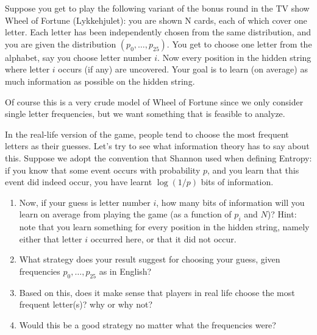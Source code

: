 \documentclass{article}
\begin{document}
\begin{exmp}
    \small
    Suppose you get to play the following variant of the bonus round in the TV show Wheel of Fortune (Lykkehjulet): you are shown N cards, each of which cover one letter. Each letter has been independently chosen from the same distribution, and you are given the distribution $(p_0,\dots,p_{25})$. You get to choose one letter from the alphabet, say you choose letter number $i$. Now every position in the hidden string where letter $i$ occurs (if any) are uncovered. Your goal is to learn (on average) as much information as possible on the hidden string. 

    Of course this is a very crude model of Wheel of Fortune since we only consider single letter frequencies, but we want something that is feasible to analyze. 

    In the real-life version of the game, people tend to choose the most frequent letters as their guesses. Let’s try to see what information theory has to say about this. Suppose we adopt the convention that Shannon used when defining Entropy: if you know that some event occurs with probability $p$, and you learn that this event did indeed occur, you have learnt $\log(1/p)$ bits of information.
    \begin{enumerate}
        \item Now, if your guess is letter number $i$, how many bits of information will you learn on average from playing the game (as a function of $p_i$ and $N$)? Hint: note that you learn something for every position in the hidden string, namely either that letter $i$ occurred here, or that it did not occur.
        \item  What strategy does your result suggest for choosing your guess, given frequencies $p_0, \dots, p_{25}$ as in English?
        \item Based on this, does it make sense that players in real life choose the most frequent letter(s)? why or why not?
        \item Would this be a good strategy no matter what the frequencies were?
    \end{enumerate}
\end{exmp}
\normalsize
\end{document}
